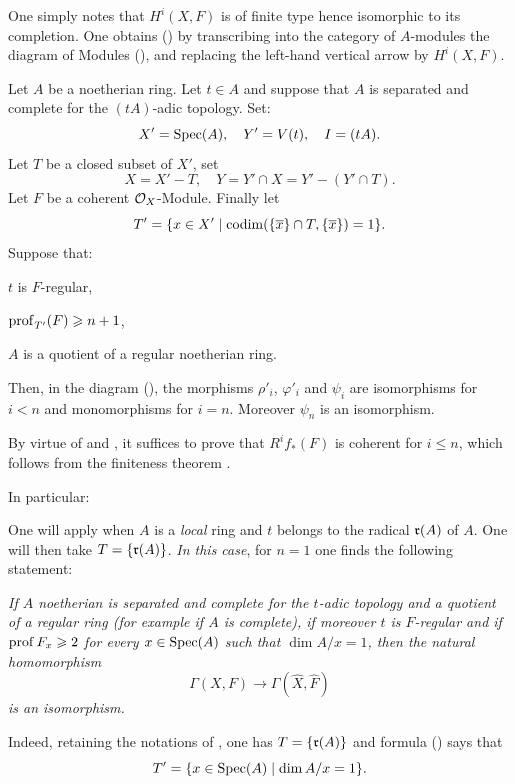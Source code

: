 One simply notes that $H^i(X, F)$ is of finite type hence isomorphic
to its completion. One obtains () by transcribing into
the category of $A$-modules the diagram of Modules
(), and replacing the left-hand vertical arrow by
$H^i(X, F)$.

\begin{proposition}\setcounter {equation}{30} \label{IX.1.4}
Let $A$ be a noetherian ring. Let $t\in A$ and suppose that $A$ is separated and complete for the $(tA)$-adic topology. Set:
\begin{equation} \label{eq:IX.1.31}
X'=\operatorname{Spec} (A), \quad Y'=V(t), \quad I=(tA).
\end{equation}
Let $T$ be a closed subset of $X'$, set
\begin{equation} \label{eq:IX.1.32}
X=X'-T, \quad Y=Y'\cap X=Y'-(Y'\cap T).
\end{equation}
Let $F$ be a coherent $\mathcal{O}_X$-Module. Finally let
\begin{equation} \label{eq:IX.1.33}
T'= \{ x\in X' \mid \operatorname{codim}(\{ \overline{x}\} \cap T, \{\overline{x}\})=1\}.
\end{equation}
Suppose that:
\begin{enumeratea}
\item
$t$ is $F$-regular,
\item
$\operatorname{prof}_{T'}(F) \geqslant n+1$,
\item
$A$ is a quotient of a regular noetherian ring.
\end{enumeratea}
\noindent
Then, in the diagram (), the morphisms $\rho'_i$, $\varphi'_i$ and $\psi_i$ are isomorphisms for $i<n$ and monomorphisms for $i=n$. Moreover $\psi_n$ is an isomorphism.
\end{proposition}

By virtue of  and , it suffices to prove that $R^if_*(F)$ is coherent for $i\leq n$, which follows from the finiteness theorem .

In particular:

\begin{example} \label{IX.1.5} One will apply  when $A$ is a \emph{local} ring and $t$ belongs to the radical $\mathfrak{r}(A)$ of $A$. One will then take $T=\{ \mathfrak{r}(A)\}$. \emph{In this case}, for $n=1$ one finds the following statement:

\emph{If $A$ noetherian is separated and complete for the $t$-adic topology and a quotient of a regular ring (for example if $A$ is complete), if moreover $t$ is $F$-regular and if $\operatorname{prof} F_x\geqslant 2$ for every $x\in \operatorname{Spec} (A)$ such that $\dim A/x=1$, then the natural homomorphism
\[
\Gamma(X, F)\to\Gamma(\hat{X}, \hat{F})
\]
is an isomorphism.}

Indeed, retaining the notations of , one has $T=\{ \mathfrak{r}(A)\}$ and formula () says that
\[
T'=\{x\in\operatorname{Spec}(A)\mid\dim A/x=1\}.
\]
\end{example}
